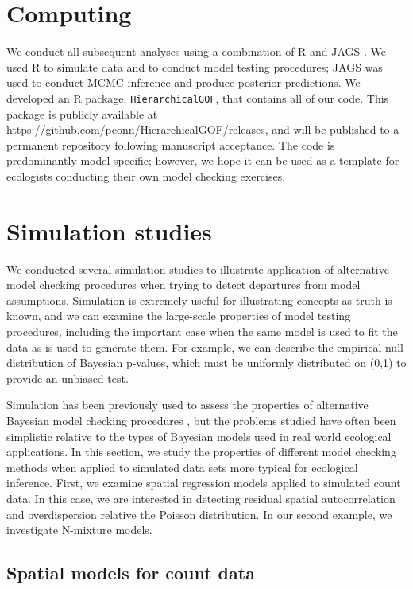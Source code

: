 \documentclass[12pt,english]{article}
\begin{document}
\begin{spacing}{1.9}
\section{Computing}

We conduct all subsequent analyses using a combination of R
\citep{RTeam2015} and JAGS \citep{Plummer2003}.  We used R to simulate
data and to conduct model testing procedures; JAGS was used to conduct
MCMC inference and produce posterior predictions. We developed an R
package, \texttt{HierarchicalGOF}, that contains all of our code.
This package is publicly available at
\url{https://github.com/pconn/HierarchicalGOF/releases}, and will be
published to a permanent repository following manuscript
acceptance. The code is predominantly model-specific; however, we hope
it can be used as a template for ecologists conducting their own model
checking exercises.


\section{Simulation studies}

We conducted several simulation studies to illustrate application of
alternative model checking procedures when trying to detect departures
from model assumptions.  Simulation is extremely useful for
illustrating concepts as truth is known, and we can examine the
large-scale properties of model testing procedures, including the
important case when the same model is used to fit the data as is used
to generate them.  For example, we can describe the empirical null
distribution of Bayesian p-values, which must be uniformly distributed
on (0,1) to provide an unbiased test.

Simulation has been previously used to assess the properties of
alternative Bayesian model checking procedures
\citep[e.g.,][]{Gosselin2011,YuanJohnson2012,Zhang2014}, but the
problems studied have often been simplistic relative to the types of
Bayesian models used in real world ecological applications.  In this
section, we study the properties of different model checking methods
when applied to simulated data sets more typical for ecological
inference.  First, we examine spatial regression models applied to
simulated count data.  In this case, we are interested in detecting
residual spatial autocorrelation and overdispersion relative the
Poisson distribution.  In our second example, we investigate N-mixture
models.

\subsection{Spatial models for count data}


\end{spacing}
\end{document}
